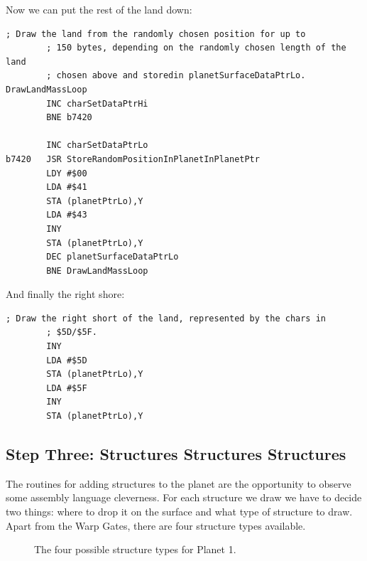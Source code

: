 Now we can put the rest of the land down:


\begin{lstlisting}[caption=Write pairs of \icode{\$41,\$43} for the main land mass.]
        ; Draw the land from the randomly chosen position for up to
        ; 150 bytes, depending on the randomly chosen length of the land
        ; chosen above and storedin planetSurfaceDataPtrLo.
DrawLandMassLoop   
        INC charSetDataPtrHi
        BNE b7420

        INC charSetDataPtrLo
b7420   JSR StoreRandomPositionInPlanetInPlanetPtr
        LDY #$00
        LDA #$41
        STA (planetPtrLo),Y
        LDA #$43
        INY
        STA (planetPtrLo),Y
        DEC planetSurfaceDataPtrLo
        BNE DrawLandMassLoop
\end{lstlisting}

And finally the right shore:

\begin{lstlisting}[caption=Drawing the right hand shore..]
        ; Draw the right short of the land, represented by the chars in
        ; $5D/$5F.
        INY
        LDA #$5D
        STA (planetPtrLo),Y
        LDA #$5F
        INY
        STA (planetPtrLo),Y
\end{lstlisting}


\subsection{Step Three: Structures Structures Structures}
The routines for adding structures to the planet are the opportunity to observe some assembly language cleverness.
For each structure we draw we have to decide two things: where to drop it on the surface and what type of structure
to draw. Apart from the Warp Gates, there are four structure types available. 

\begin{figure}[H]
  {
    \setlength{\tabcolsep}{3.0pt}
    \setlength\cmidrulewidth{\heavyrulewidth} %
    \begin{adjustbox}{width=15cm,center}
      \begin{subfigure}{0.3\textwidth}
        
      \end{subfigure}
      \begin{subfigure}{0.3\textwidth}
        
      \end{subfigure}
      \begin{subfigure}{0.3\textwidth}
        
      \end{subfigure}
      \begin{subfigure}{0.3\textwidth}
        
      \end{subfigure}
    \end{adjustbox}
  }\caption[]{The four possible structure types for Planet 1.}
\end{figure}

